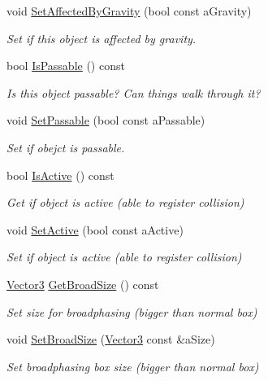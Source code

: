 \begin{DoxyCompactItemize}
void \hyperlink{classPhysicsObject_a8593d870fbbb5cc25d759eaf4acd847b}{Set\+Affected\+By\+Gravity} (bool const a\+Gravity)
\begin{DoxyCompactList}\small\item\em Set if this object is affected by gravity. \end{DoxyCompactList}\item 
bool \hyperlink{classPhysicsObject_ab9863bdf8badc7ae67fc841320dba5ae}{Is\+Passable} () const 
\begin{DoxyCompactList}\small\item\em Is this object passable? Can things walk through it? \end{DoxyCompactList}\item 
void \hyperlink{classPhysicsObject_a573ecf16903078e9085408000bc6ed1e}{Set\+Passable} (bool const a\+Passable)
\begin{DoxyCompactList}\small\item\em Set if obejct is passable. \end{DoxyCompactList}\item 
bool \hyperlink{classPhysicsObject_a7ef659e83d2d3605a22fd4a0d9c6ebe9}{Is\+Active} () const 
\begin{DoxyCompactList}\small\item\em Get if object is active (able to register collision) \end{DoxyCompactList}\item 
void \hyperlink{classPhysicsObject_a11af11559e117d6e2998105e460bb405}{Set\+Active} (bool const a\+Active)
\begin{DoxyCompactList}\small\item\em Set if object is active (able to register collision) \end{DoxyCompactList}\item 
\hyperlink{structVector3}{Vector3} \hyperlink{classPhysicsObject_a37f669f2c77bc0b014b8476288b856fa}{Get\+Broad\+Size} () const 
\begin{DoxyCompactList}\small\item\em Set size for broadphasing (bigger than normal box) \end{DoxyCompactList}\item 
void \hyperlink{classPhysicsObject_aeeae8ada03b8826e4ce3e972ac4f77e0}{Set\+Broad\+Size} (\hyperlink{structVector3}{Vector3} const \&a\+Size)
\begin{DoxyCompactList}\small\item\em Set broadphasing box size (bigger than normal box) \end{DoxyCompactList}\item 

\end{DoxyCompactItemize}
